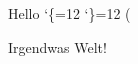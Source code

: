 \documentclass{minimal}
\newenvironment{Null}{%
  \catcode`\{=12
  \catcode`\}=12
  \DoNull
}{%
  \ignorespacesafterend
}
\newcommand\DoNull()
\begin{document}
Hello
\begin{Null}
 \begin{center}
 \end{center}
Irgendwas
\end{Null}
Welt!
\end{document}
